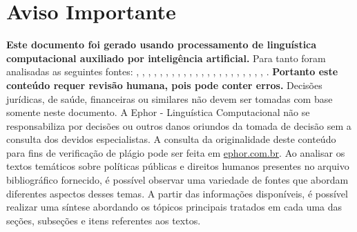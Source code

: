 \documentclass[
   article,       
   12pt,          
   oneside,       
   a4paper,       
   english,       
   brazil,        
   sumario=tradicional
   ]{abntex2}
\begin{document}
\frenchspacing 
\maketitle

\textual
\section{Aviso Importante}
\textbf{Este documento foi gerado usando processamento de linguística computacional auxiliado por inteligência artificial.} Para tanto foram analisadas as seguintes fontes:  \cite{A_CAUSA_E_AS_POLITICAS_DE_DIREITOS_HUMANOS_NO}, \cite{Ciclo_de_Politicas_Publicas_por_que_e_importa}, \cite{Conheca_o_ciclo_das_politicas_publicas__Polit}, \cite{Educacao_Inclusiva_Conheca_o_historico_da_leg}, \cite{Em_Buenos_Aires_Silvio_Almeida_defende_a_inst}, \cite{Entendendo_a_Tipologia_de_Politicas_Publicas_}, \cite{Escola_Nacional_de_Administracao_Publica__Wik}, \cite{Especialista_em_politicas_publicas_e_gestao_g}, \cite{FEDERALISMO_E_POLITICAS_PUBLICAS_NO_BRASIL_Ho}, \cite{Institucionalizacao_das_politicas_em_Direitos}, \cite{Ministerio_do_Planejamento_e_Orcamento__Wikip}, \cite{Ministro_defende_que_direitos_humanos_precisa}, \cite{Politica_conceito_politicas_publicas_e_partid}, \cite{Politica_publica__o_que_e_tipos_de_politicas_}, \cite{Politica_publica__Wikipedia_a_enciclopedia_li}, \cite{Politicas_publicas__Wikipedia_la_enciclopedia}, \cite{Politicas_Publicas_entenda_o_que_sao_para_que}, \cite{Politicas_Publicas_o_que_sao_e_para_que_serve}, \cite{Politicas_publicas_o_que_sao_e_para_que_serve}, \cite{Politicas_publicas_o_que_sao_quem_faz_e_tipos}, \cite{Politicas_publicas_o_que_sao_tipos_e_exemplos}, \cite{Revista_USP_119__Dossie_1_Democracia_e_politi}, \cite{TCU_Ciclo_das_politicas_publicas__Tudo_o_que_}.
\textbf{Portanto este conteúdo requer revisão humana, pois pode conter erros.} Decisões jurídicas, de saúde, financeiras ou similares não devem ser tomadas com base somente neste documento. A Ephor - Linguística Computacional não se responsabiliza por decisões ou outros danos oriundos da tomada de decisão sem a consulta dos devidos especialistas.
A consulta da originalidade deste conteúdo para fins de verificação de plágio pode ser feita em \href{http://www.ephor.com.br}{ephor.com.br}.
Ao analisar os textos temáticos sobre políticas públicas e direitos humanos presentes no arquivo bibliográfico fornecido, é possível observar uma variedade de fontes que abordam diferentes aspectos desses temas. A partir das informações disponíveis, é possível realizar uma síntese abordando os tópicos principais tratados em cada uma das seções, subseções e itens referentes aos textos.
\end{document}
